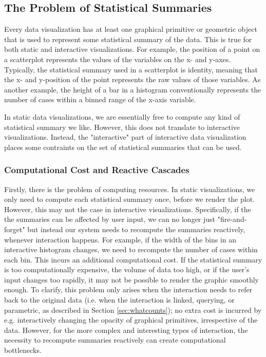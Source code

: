 \documentclass[12pt,a4paper]{article}
\begin{document}
\subsection{The Problem of Statistical Summaries}
\label{sec:problem}

Every data visualization has at least one graphical primitive or geometric object that is used to represent some statistical summary of the data. This is true for both static and interactive visualizations. For example, the position of a point on a scatterplot represents the values of the variables on the x- and y-axes. Typically, the statistical summary used in a scatterplot is identity, meaning that the x- and y-position of the point represents the raw values of those variables. As another example, the height of a bar in a histogram conventionally represents the number of cases within a binned range of the x-axis variable. 

In static data visualizations, we are essentially free to compute any kind of statistical summary we like. However, this does not translate to interactive visualizations. Instead, the "interactive" part of interactive data visualization places some contraints on the set of statistical summaries that can be used.  

\subsubsection{Computational Cost and Reactive Cascades}
\label{sec:reactivecascades}

Firstly, there is the problem of computing resources. In static visualizations, we only need to compute each statistical summary once, before we render the plot. However, this may not the case in interactive visualizations. Specifically, if the the summaries can be affected by user input, we can no longer just "fire-and-forget" but instead our system needs to recompute the summaries reactively, whenever interaction happens. For example, if the width of the bins in an interactive histogram changes, we need to recompute the number of cases within each bin. This incurs an additional computational cost. If the statistical summary is too computationally expensive, the volume of data too high, or if the user's input changes too rapidly, it may not be possible to render the graphic smoothly enough. To clarify, this problem only arises when the interaction needs to refer back to the original data (i.e. when the interaction is linked, querying, or parametric, as described in Section \ref{sec:whatcounts}); no extra cost is incurred by e.g. interactively changing the opacity of graphical primitives, irrespective of the data. However, for the more complex and interesting types of interaction, the necessity to recompute summaries reactively can create computational bottlenecks.   
\end{document}
